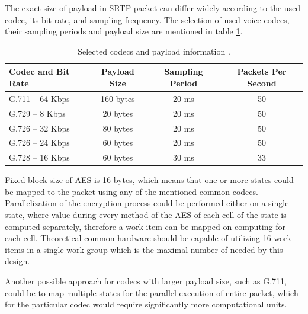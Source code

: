 The exact size of payload in SRTP packet can differ widely according to the 
used codec, its bit rate, and sampling frequency. The selection of used voice
codecs, their sampling periods and payload size are mentioned in table 
\ref{bandwidth}.

\begin{table}[H]
\begin{center}
\begin{tabular}{|l|ccc|}\hline%
  Codec and Bit Rate & Payload Size & Sampling Period & Packets Per Second\\\hline
  G.711 -- 64 Kbps   & 160 bytes    & 20 ms           & 50 \\
  G.729 -- 8 Kbps    & 20 bytes     & 20 ms           & 50 \\
  G.726 -- 32 Kbps   & 80 bytes     & 20 ms           & 50 \\
  G.726 -- 24 Kbps   & 60 bytes     & 20 ms           & 50 \\
  G.728 -- 16 Kbps   & 60 bytes     & 30 ms           & 33 \\
 \hline
\end{tabular}
\end{center}
\caption[Codec payloads]{Selected codecs and payload information 
\cite{rtpbandwidth}.}
\label{bandwidth}
\end{table}

Fixed block size of AES is 16 bytes, which means that one or more states could
be mapped to the packet using any of the mentioned common codecs. Parallelization
of the encryption process could be performed either on a single state, where
value during every method of the AES of each cell of the state is computed 
separately, therefore a work-item can be mapped on computing for each cell. 
Theoretical common hardware should be capable of utilizing 16 work-items in a 
single work-group which is the maximal number of needed by this design.

Another possible approach for codecs with larger payload size, such as G.711, 
could be to map multiple states for the parallel execution of entire packet, 
which for the particular codec would require significantly more computational 
units. 

\vspace{1em}

